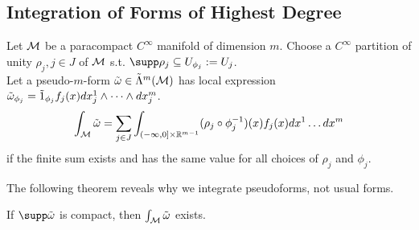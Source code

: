 \documentclass[../main.tex]{subfiles}
\begin{document}
    \subsection{Integration of Forms of Highest Degree}
    \begin{definition}[Integration]\label{def:top-form-integration}
        Let \(\manifold[M]\) be a paracompact \(C^\infty\) manifold of dimension 
        \(m\). 
        Choose a \(C^\infty\) partition of unity \(\rho_j, j \in J\) of 
        \(\manifold[M]\) s.t. \(\supp \rho_j \subseteq U_{\phi_j} := U_j\). \\
        Let a pseudo-\(m\)-form \(\pseudo{\omega} \in 
        \pseudoform{m}{M}\) has local expression 
        \(\tilde{\omega}_{\phi_j} = \pseudo{1}_{\phi_j}f_j(x)dx^1_j\wedge \dots\wedge dx^m_j\).
        \[
        \int_{\manifold[M]} \tilde{\omega} = 
        \sum_{j \in J}^{} \int_{(-\infty, 0] \times \mathbb{R}^{m-1}}
        (\rho_j \circ \phi_j ^{-1})(x) f_j(x) dx^1\dots dx^m
        \]
        if the finite sum exists and has the same value for all choices of 
        \(\rho_j\) and \(\phi_j\).
    \end{definition}
    \begin{remark}
        The following theorem reveals why we integrate pseudoforms, not usual forms.
    \end{remark}
    \begin{theorem}\label{thm:cpt-form-integral-exist}
        If \(\supp \tilde{\omega}\) is compact, then 
        \(\int_{\manifold[M]} \tilde{\omega}\) exists.
    \end{theorem}
\end{document}
